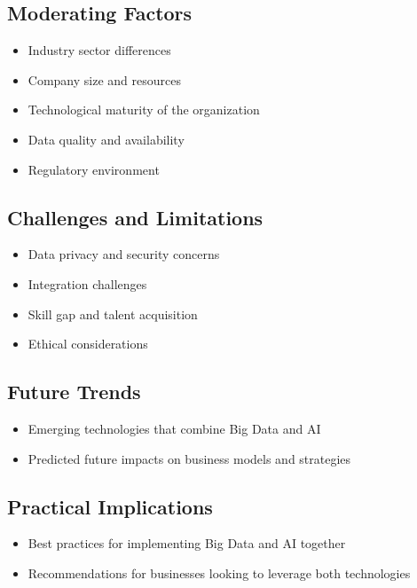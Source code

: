 \documentclass{article}
\theoremstyle{mytheoremstyle}
\theoremstyle{mytheoremstyle}
\theoremstyle{myproblemstyle}
\begin{document}
\subsection{Moderating Factors}
\begin{itemize}
    \item Industry sector differences
    \item Company size and resources
    \item Technological maturity of the organization
    \item Data quality and availability
    \item Regulatory environment
\end{itemize}

\subsection{Challenges and Limitations}
\begin{itemize}
    \item Data privacy and security concerns
    \item Integration challenges
    \item Skill gap and talent acquisition
    \item Ethical considerations
\end{itemize}

\subsection{Future Trends}
\begin{itemize}
    \item Emerging technologies that combine Big Data and AI
    \item Predicted future impacts on business models and strategies
\end{itemize}

\subsection{Practical Implications}
\begin{itemize}
    \item Best practices for implementing Big Data and AI together
    \item Recommendations for businesses looking to leverage both technologies
\end{itemize}

    
\end{document}
